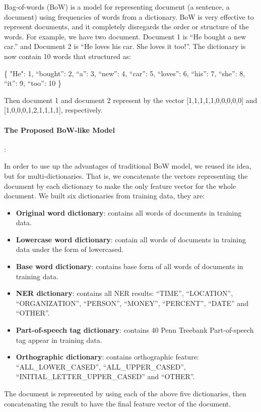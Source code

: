 \documentclass{llncs}
\begin{document}
Bag-of-words (BoW) is a model for representing document (a sentence, a document) using frequencies of words from a dictionary. BoW is very effective to represent documents, and it completely disregards the order or structure of the words. For example, we have two document. Document 1 is “He bought a new car.” and Document 2 is “He loves his car. She loves it too!”. The dictionary is now contain 10 words that structured as:

\textsf{\{
"He": 1, 
“bought”: 2,
“a”: 3,
“new”: 4,
“car”: 5,
“loves”: 6,
“his”: 7,
“she”: 8,
“it”: 9,
“too”: 10
\}	}

Then document 1 and document 2 represent by the vector [1,1,1,1,1,0,0,0,0,0] and [1,0,0,0,1,2,1,1,1,1], respectively.

\paragraph{The Proposed BoW-like Model}:

In order to use up the advantages of traditional BoW model, we reused its idea, but for multi-dictionaries. That is, we concatenate the vectors representing the document by each dictionary to make the only feature vector for the whole document. We built six dictionaries from training data, they are:

\begin{itemize}
\item \textbf{Original word dictionary}: contains all words of documents in training data.
\item \textbf{Lowercase word dictionary}: contain all words of documents in training data under the form of lowercased.
\item \textbf{Base word dictionary}: contains base form of all words of documents in training data.
\item \textbf{NER dictionary}: contains all NER results: “TIME”, “LOCATION”, “ORGANIZATION”, “PERSON”, “MONEY”, “PERCENT”, “DATE” and “OTHER”.
\item \textbf{Part-of-speech tag dictionary}: contains 40 Penn Treebank Part-of-speech tag appear in training data.
\item \textbf{Orthographic dictionary}: contains orthographic feature: “ALL\_LOWER\_CASED”, “ALL\_UPPER\_CASED”, “INITIAL\_LETTER\_UPPER\_CASED” and “OTHER”.

\end{itemize}

The document is represented by using each of the above five dictionaries, then concatenating the result to have the final feature vector of the document.
\end{document}
